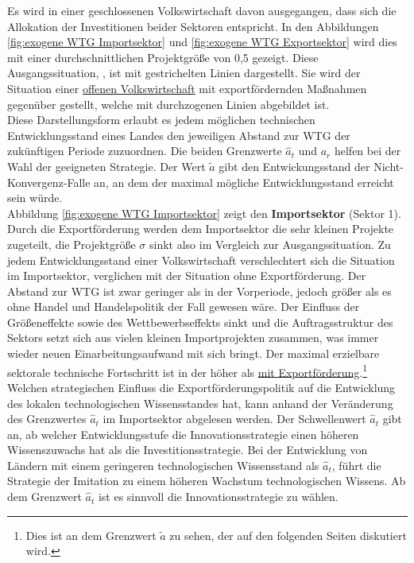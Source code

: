 Es wird in einer geschlossenen Volkswirtschaft davon ausgegangen, dass sich die Allokation der Investitionen beider Sektoren entspricht. In den Abbildungen \ref{fig:exogene WTG Importsektor} und \ref{fig:exogene WTG Exportsektor}  wird dies mit einer durchschnittlichen Projektgrö{\ss}e von 0,5 gezeigt. Diese Ausgangssituation, , ist mit gestrichelten Linien dargestellt. Sie wird der Situation einer \uline{offenen Volkswirtschaft} mit exportfördernden Ma{\ss}nahmen gegenüber gestellt, welche mit durchzogenen Linien abgebildet ist. \\


Diese Darstellungsform erlaubt es jedem möglichen technischen Entwicklungsstand eines Landes den jeweiligen Abstand zur WTG der zukünftigen Periode zuzuordnen. Die beiden Grenzwerte $\hat{a}_t$ und $a_r$ helfen bei der Wahl der geeigneten Strategie. Der Wert $\tilde{a}$ gibt den Entwickungsstand der Nicht-Konvergenz-Falle an, an dem der maximal mögliche Entwicklungsstand erreicht sein würde. \\


Abbildung \ref{fig:exogene WTG Importsektor} zeigt den \textbf{Importsektor} (Sektor 1). Durch die Exportförderung werden dem Importsektor die sehr kleinen Projekte zugeteilt, die Projektgrö{\ss}e $\sigma$ sinkt also im Vergleich zur Ausgangssituation. Zu jedem Entwicklungsstand einer Volkswirtschaft verschlechtert sich die Situation im Importsektor, verglichen mit der Situation ohne Exportförderung. Der Abstand zur WTG ist zwar geringer als in der Vorperiode, jedoch grö{\ss}er als es ohne Handel und Handelspolitik der Fall gewesen wäre. Der Einfluss der Grö{\ss}eneffekte sowie des Wettbewerbseffekts sinkt und die Auftragsstruktur des Sektors setzt sich aus vielen kleinen Importprojekten zusammen, was immer wieder neuen Einarbeitungsaufwand mit sich bringt. Der maximal erzielbare sektorale technische Fortschritt ist in der  höher als \uline{mit Exportförderung}.\footnote{Dies ist an dem Grenzwert $\tilde{a}$ zu sehen, der auf den folgenden Seiten diskutiert wird.}\\
Welchen strategischen Einfluss die Exportförderungspolitik auf die Entwicklung des lokalen technologischen Wissensstandes  hat, kann anhand der Veränderung des Grenzwertes $\hat{a}_t$ im Importsektor abgelesen werden. Der Schwellenwert $\hat{a}_t$ gibt an, ab welcher Entwicklungsstufe die Innovationsstrategie einen höheren Wissenszuwachs hat als die Investitionsstrategie. Bei der Entwicklung von Ländern mit einem geringeren technologischen Wissensstand als $\hat{a}_t$, führt die \textcolor[rgb]{0,0.32,0}{Strategie der Imitation} zu einem höheren Wachstum technologischen Wissens. Ab dem Grenzwert $\hat{a}_t$ ist es sinnvoll die \textcolor[rgb]{0.74,0.97,0.22}{Innovationsstrategie} zu wählen.\\


